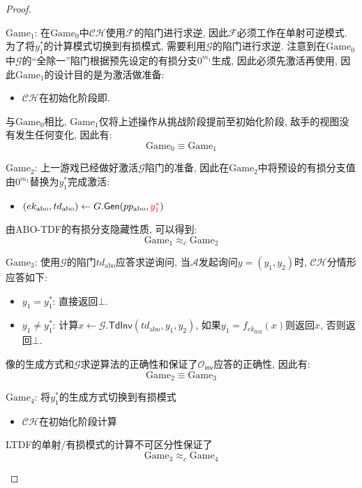 \begin{proof}
\begin{trivlist}
\item $\text{Game}_1$: 在$\text{Game}_0$中$\mathcal{CH}$使用$\mathcal{F}$的陷门进行求逆, 
	因此$\mathcal{F}$必须工作在单射可逆模式. 为了将$y_1^*$的计算模式切换到有损模式, 
	需要利用$\mathcal{G}$的陷门进行求逆. 注意到在$\text{Game}_0$中$\mathcal{G}$的``全除一''陷门根据预先设定的有损分支$0^{m_1}$生成, 
	因此必须先激活再使用, 因此$\text{Game}_1$的设计目的是为激活做准备:  
\begin{itemize}
    \item $\mathcal{CH}$在初始化阶段即.
\end{itemize}
与$\text{Game}_0$相比, $\text{Game}_1$仅将上述操作从挑战阶段提前至初始化阶段, 敌手的视图没有发生任何变化, 因此有: 
\begin{equation*} 
    \text{Game}_0 \equiv \text{Game}_1
\end{equation*}

\item $\text{Game}_2$: 上一游戏已经做好激活$\mathcal{G}$陷门的准备, 
	因此在$\text{Game}_2$中将预设的有损分支值由$0^{m_1}$替换为$y_1^*$完成激活:
\begin{itemize} 
    \item $(ek_\text{abo}, td_\text{abo}) \leftarrow G.\mathsf{Gen}(pp_\text{abo}, {\color{red} y_1^*})$
\end{itemize}
由ABO-TDF的有损分支隐藏性质, 可以得到:
\begin{equation*}
   	\text{Game}_1 \approx_c \text{Game}_2
\end{equation*}

\item $\text{Game}_3$: 使用$\mathcal{G}$的陷门$td_\text{abo}$应答求逆询问, 
	当$\mathcal{A}$发起询问$y = (y_1, y_2)$时, $\mathcal{CH}$分情形应答如下:  
\begin{itemize}
    \item $y_1 = y_1^*$: 直接返回$\bot$. 
    \item $y_1 \neq y_1^*$: 计算$x \leftarrow \mathcal{G}.\mathsf{TdInv}(td_\text{abo}, y_1, y_2)$, 
        如果$y_1 = f_{ek_\text{ltdf}}(x)$则返回$x$, 否则返回$\bot$.
\end{itemize} 
像的生成方式和$\mathcal{G}$求逆算法的正确性和保证了$\mathcal{O}_\mathsf{inv}$应答的正确性, 因此有: 
\begin{equation*}
    \text{Game}_2 \equiv \text{Game}_3 
\end{equation*}

\item $\text{Game}_4$: 将$y_1^*$的生成方式切换到有损模式
\begin{itemize}
	\item $\mathcal{CH}$在初始化阶段计算
\end{itemize}
LTDF的单射/有损模式的计算不可区分性保证了
\begin{equation*}  
    \text{Game}_3 \approx_c \text{Game}_4
\end{equation*}
\end{trivlist}


\end{proof}
